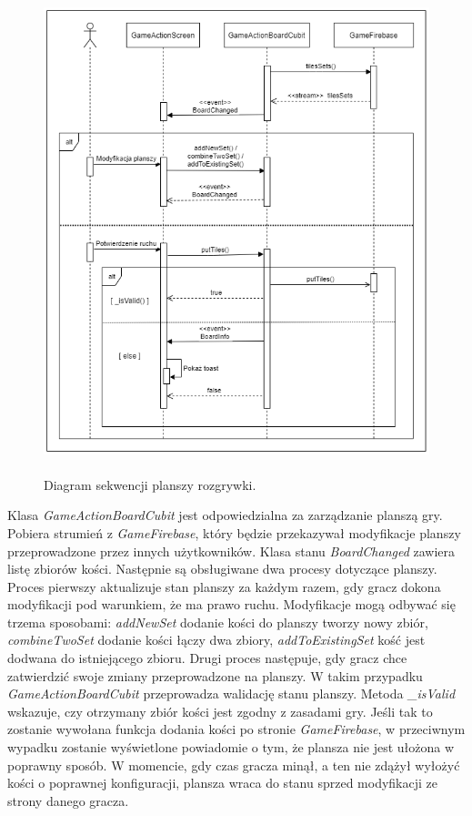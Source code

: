 \begin{figure}[h!]
	\begin{center}
		\includegraphics[width=16cm,height=14cm]{img/diagram-sekwencji-board.png}
	\end{center}
	\caption{{\color{dgray}Diagram sekwencji planszy rozgrywki.}} 
	\label{GameActionBoardCubit}
\end{figure} 

Klasa \emph{GameActionBoardCubit} jest odpowiedzialna za zarządzanie planszą gry. Pobiera strumień z \emph{GameFirebase}, który będzie przekazywał modyfikacje planszy przeprowadzone przez innych użytkowników. Klasa stanu \emph{BoardChanged} zawiera listę zbiorów kości. Następnie są obsługiwane dwa procesy dotyczące planszy. Proces pierwszy aktualizuje stan planszy za każdym razem, gdy gracz dokona modyfikacji pod warunkiem, że ma prawo ruchu. Modyfikacje mogą odbywać się trzema sposobami: \emph{addNewSet} dodanie kości do planszy tworzy nowy zbiór, \emph{combineTwoSet} dodanie kości łączy dwa zbiory, \emph{addToExistingSet} kość jest dodwana do istniejącego zbioru. Drugi proces następuje, gdy gracz chce zatwierdzić swoje zmiany przeprowadzone na planszy. W takim przypadku \emph{GameActionBoardCubit} przeprowadza walidację stanu planszy. Metoda \emph{\_isValid} wskazuje, czy otrzymany zbiór kości jest zgodny z zasadami gry. Jeśli tak to zostanie wywołana funkcja dodania kości po stronie \emph{GameFirebase}, w przeciwnym wypadku zostanie wyświetlone powiadomie o tym, że plansza nie jest ułożona w poprawny sposób. W momencie, gdy czas gracza minął, a ten nie zdążył wyłożyć kości o poprawnej konfiguracji, plansza wraca do stanu sprzed modyfikacji ze strony danego gracza. \\ \\ \\ \\

